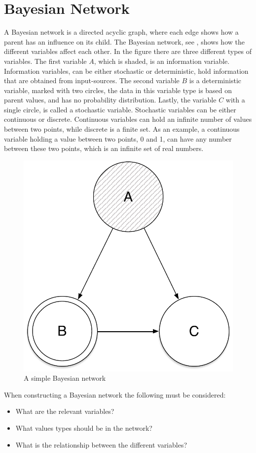 \section{Bayesian Network}\label{section:bayesian-network}
A Bayesian network is a directed acyclic graph, where each edge shows how a parent has an influence on its child.
The Bayesian network, see , shows how the different variables affect each other.
In the figure there are three different types of variables.
The first variable $A$, which is shaded, is an information variable. 
Information variables, can be either stochastic or deterministic, hold information that are obtained from input-sources.
The second variable $B$ is a deterministic variable, marked with two circles, the data in this variable type is based on parent values, and has no probability distribution.
Lastly, the variable $C$ with a single circle, is called a stochastic variable. 
Stochastic variables can be either continuous or discrete.
Continuous variables can hold an infinite number of values between two points, while discrete is a finite set.
As an example, a continuous variable holding a value between two points, 0 and 1, can have any number between these two points, which is an infinite set of real numbers.

\begin{figure}[H]
    \centering
    \includegraphics[scale=0.35]{media/Bayesian-network-abc}
    \caption{A simple Bayesian network}
    \label{figure:simple-Bayesian-network}
\end{figure}

When constructing a Bayesian network the following must be considered: 
\begin{itemize}
    \item What are the relevant variables? 
    \item What values types should be in the network?
    \item What is the relationship between the different variables?
\end{itemize}